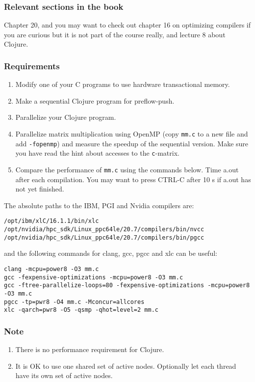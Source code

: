 \documentclass{forsete}
\begin{document}
{\subsubsection*{Relevant sections in the book}
Chapter 20, and you may want to check out chapter 16 on optimizing compilers if you are curious but it is
not part of the course really, and lecture 8 about Clojure.
\subsubsection*{Requirements}
\begin{enumerate}
\item Modify one of your C programs to use hardware transactional memory.
\item Make a sequential Clojure program for preflow-push.
\item Parallelize your Clojure program.
\item Parallelize matrix multiplication using OpenMP (copy \verb!mm.c! to a new file and add \verb.-fopenmp.) 
and measure the speedup of the sequential version.  Make sure you have read the hint about accesses to the \verb.c.-matrix.
\item Compare the performance of \verb!mm.c! using the commands below.
Time a.out after each compilation. You may want to press CTRL-C after 10 s if
a.out has not yet finished.
\end{enumerate}
The absolute paths to the IBM, PGI and Nvidia compilers are:
\begin{verbatim} 
/opt/ibm/xlC/16.1.1/bin/xlc
/opt/nvidia/hpc_sdk/Linux_ppc64le/20.7/compilers/bin/nvcc
/opt/nvidia/hpc_sdk/Linux_ppc64le/20.7/compilers/bin/pgcc
\end{verbatim}
and the following commands for clang, gcc, pgcc and xlc can be useful:
\begin{verbatim} 
clang -mcpu=power8 -O3 mm.c
gcc -fexpensive-optimizations -mcpu=power8 -O3 mm.c
gcc -ftree-parallelize-loops=80 -fexpensive-optimizations -mcpu=power8 -O3 mm.c
pgcc -tp=pwr8 -O4 mm.c -Mconcur=allcores
xlc -qarch=pwr8 -O5 -qsmp -qhot=level=2 mm.c
\end{verbatim}

\subsubsection*{Note}
\begin{enumerate}
\item There is no performance requirement for Clojure.
\item It is OK to use one shared set of active nodes. Optionally let each thread have
its own set of active nodes.
\end{enumerate}

}
\end{document}
